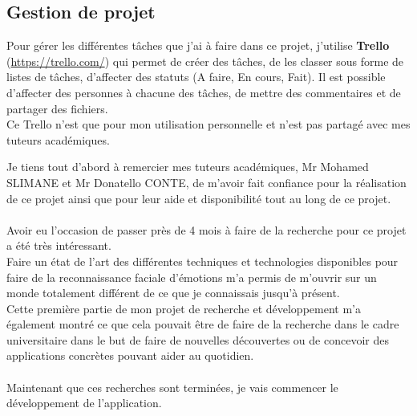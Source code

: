 \documentclass[poster]{polytech/polytech}
\begin{document}
\subsection{Gestion de projet}
Pour gérer les différentes tâches que j'ai à faire dans ce projet, j'utilise \textbf{Trello} (\url{https://trello.com/}) qui permet de créer des tâches, de les classer sous forme de listes de tâches, d'affecter des statuts (A faire, En cours, Fait). Il est possible d'affecter des personnes à chacune des tâches, de mettre des commentaires et de partager des fichiers.\\
Ce Trello n'est que pour mon utilisation personnelle et n'est pas partagé avec mes tuteurs académiques.




Je tiens tout d'abord à remercier mes tuteurs académiques, Mr Mohamed SLIMANE et Mr Donatello CONTE, de m'avoir fait confiance pour la réalisation de ce projet ainsi que pour leur aide et disponibilité tout au long de ce projet.\\
\\
Avoir eu l'occasion de passer près de 4 mois à faire de la recherche pour ce projet a été très intéressant.\\
Faire un état de l'art des différentes techniques et technologies disponibles pour faire de la reconnaissance faciale d'émotions m'a permis de m'ouvrir sur un monde totalement différent de ce que je connaissais jusqu'à présent.\\
Cette première partie de mon projet de recherche et développement m'a également montré ce que cela pouvait être de faire de la recherche dans le cadre universitaire dans le but de faire de nouvelles découvertes ou de concevoir des applications concrètes pouvant aider au quotidien.\\
\\
Maintenant que ces recherches sont terminées, je vais commencer le développement de l'application.
\end{document}
